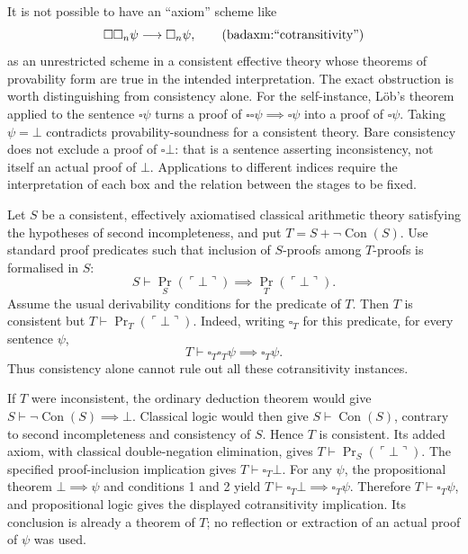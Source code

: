 \begin{badaxiom}[``cotransitivity'']
It is not possible to have an ``axiom'' scheme like 
\[
\square\square_n\psi \implies \square_n\psi,
\labeltagd{badaxm}{``cotransitivity''}
\]
as an unrestricted scheme in a consistent effective theory whose theorems
of provability form are true in the intended interpretation. The exact
obstruction is worth distinguishing from consistency alone. For the
self-instance, L\"ob's theorem applied to the sentence $\square\psi$
turns a proof of $\square\square\psi\implies\square\psi$ into a proof
of $\square\psi$. Taking $\psi=\bot$ contradicts provability-soundness
for a consistent theory. Bare consistency does not exclude a proof of
$\square\bot$: that is a sentence asserting inconsistency, not itself
an actual proof of $\bot$. Applications to different indices require the
interpretation of each box and the relation between the stages to be fixed.

\end{badaxiom}

\begin{proposition}
Let $S$ be a consistent, effectively axiomatised classical arithmetic
theory satisfying the hypotheses of second incompleteness, and put
$T=S+\neg\operatorname{Con}(S)$. Use standard proof predicates such
that inclusion of $S$-proofs among $T$-proofs is formalised in $S$:
\[
S\vdash\operatorname{Pr}_S(\ulcorner\bot\urcorner)
\implies\operatorname{Pr}_T(\ulcorner\bot\urcorner).
\]
Assume the usual derivability conditions for the predicate of $T$.
Then $T$ is consistent but $T\vdash\operatorname{Pr}_T(\ulcorner\bot\urcorner)$.
Indeed, writing $\square_T$ for this predicate, for every sentence $\psi$,
\[
T\vdash\square_T\square_T\psi\implies\square_T\psi.
\]
Thus consistency alone cannot rule out all these cotransitivity instances.
\end{proposition}
\Proof
If $T$ were inconsistent, the ordinary deduction theorem would give
$S\vdash\neg\operatorname{Con}(S)\implies\bot$. Classical logic would
then give $S\vdash\operatorname{Con}(S)$, contrary to second
incompleteness and consistency of $S$. Hence $T$ is consistent.
Its added axiom, with classical double-negation elimination, gives
$T\vdash\operatorname{Pr}_S(\ulcorner\bot\urcorner)$. The specified
proof-inclusion implication gives $T\vdash\square_T\bot$.
For any $\psi$, the propositional theorem $\bot\implies\psi$ and
conditions 1 and 2 yield
$T\vdash\square_T\bot\implies\square_T\psi$. Therefore
$T\vdash\square_T\psi$, and propositional logic gives the displayed
cotransitivity implication. Its conclusion is already a theorem of $T$;
no reflection or extraction of an actual proof of $\psi$ was used.
\Done


